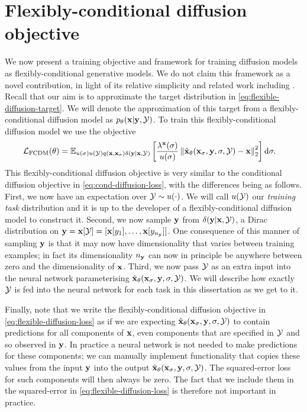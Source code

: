 \section{Flexibly-conditional diffusion objective} \label{sec:flexible-diffusion-objective}
We now present a training objective and framework for training diffusion models as flexibly-conditional generative models. We do not claim this framework as a novel contribution, in light of its relative simplicity and related work including \citet{tashiro2021csdi,weilbach2023graphically}. Recall that our aim is to approximate the target distribution in \cref{eq:flexible-diffusion-target}. We will denote the approximation of this target from a flexibly-conditional diffusion model as $p_\theta({\mathbf{x}}|{\mathbf{y}},{\mathcal{Y}})$. To train this flexibly-conditional diffusion model we use the objective
\begin{align} \label{eq:flexible-diffusion-loss}
    \mathcal{L}_\text{FCDM}(\theta) &= \mathbb{E}_{u(\sigma)u({\mathcal{Y}})q({\mathbf{x}}, {\mathbf{x}}_\sigma)\delta({\mathbf{y}}|{\mathbf{x}},{\mathcal{Y}})} \left[ 
    \frac{\lambda^{\mathbf{x}}(\sigma)}{u(\sigma)} \left\| \hat{{\mathbf{x}}}_\theta({\mathbf{x}}_\sigma, {\mathbf{y}}, \sigma, {\mathcal{Y}}) - {\mathbf{x}} \right\|_2^2 \right] \mathrm{d}\sigma.
\end{align}
This flexibly-conditional diffusion objective is very similar to the conditional diffusion objective in \cref{eq:cond-diffusion-loss}, with the differences being as follows. First, we now have an expectation over ${\mathcal{Y}} \sim u(\cdot)$. We will call $u({\mathcal{Y}})$ our \textit{training task} distribution and it is up to the developer of a flexibly-conditional diffusion model to construct it. Second, we now sample ${\mathbf{y}}$ from $\delta({\mathbf{y}}|{\mathbf{x}},{\mathcal{Y}})$, a Dirac distribution on ${\mathbf{y}} = {\mathbf{x}}[{\mathcal{Y}}] = [ {\mathbf{x}}[y_1], \ldots, {\mathbf{x}}[y_{n_{\mathbf{y}}}] ]$. One consequence of this manner of sampling ${\mathbf{y}}$ is that it may now have dimensionality that varies between training examples; in fact its dimensionality $n_{\mathbf{y}}$ can now in principle be anywhere between zero and the dimensionality of ${\mathbf{x}}$. Third, we now pass ${\mathcal{Y}}$ as an extra input into the neural network parameterising $\hat{{\mathbf{x}}}_\theta({\mathbf{x}}_\sigma, {\mathbf{y}}, \sigma, {\mathcal{Y}})$. We will describe how exactly ${\mathcal{Y}}$ is fed into the neural network for each task in this dissertation as we get to it.

Finally, note that we write the flexibly-conditional diffusion objective in  \cref{eq:flexible-diffusion-loss} as if we are expecting $\hat{{\mathbf{x}}}_\theta({\mathbf{x}}_\sigma, {\mathbf{y}}, \sigma, {\mathcal{Y}})$ to contain predictions for all components of ${\mathbf{x}}$, even components that are specified in ${\mathcal{Y}}$ and so observed in ${\mathbf{y}}$. In practice a neural network is not needed to make predictions for these components; we can manually implement functionality that copies these values from the input ${\mathbf{y}}$ into the output $\hat{{\mathbf{x}}}_\theta({\mathbf{x}}_\sigma, {\mathbf{y}}, \sigma, {\mathcal{Y}})$. The squared-error loss for such components will then always be zero. The fact that we include them in the squared-error in \cref{eq:flexible-diffusion-loss} is therefore not important in practice.

